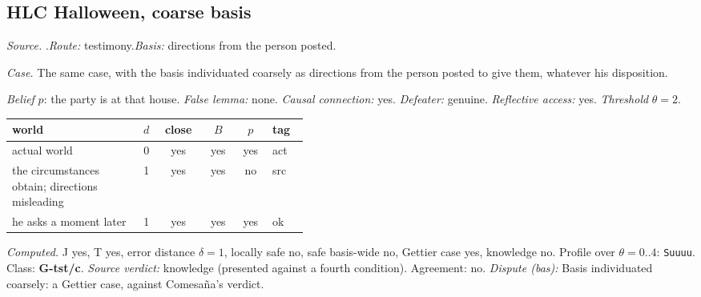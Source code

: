 \subsection*{HLC \enspace Halloween, coarse basis}
\noindent\textit{Source.} \citet{Comesana2005}.\quad \textit{Route:} testimony.\quad \textit{Basis:} directions from the person posted.\par
\noindent\textit{Case.} The same case, with the basis individuated coarsely as directions from the person posted to give them, whatever his disposition.\par
\noindent\textit{Belief} $p$: the party is at that house.
 \textit{False lemma:} none. \textit{Causal connection:} yes. \textit{Defeater:} genuine. \textit{Reflective access:} yes. \textit{Threshold} $\theta = 2$.\par
\begin{center}\begin{tabular}{@{}p{0.43\linewidth}rcccl@{}}
world & $d$ & close & $B$ & $p$ & tag \\ \midrule
actual world & 0 & yes & yes & yes & act \\
the circumstances obtain; directions misleading & 1 & yes & yes & no & src \\
he asks a moment later & 1 & yes & yes & yes & ok \\
\end{tabular}\end{center}
\noindent\textit{Computed.} J yes, T yes, error distance $\delta = 1$, locally safe no, safe basis-wide no, Gettier case yes, knowledge no. Profile over $\theta = 0..4$: \texttt{Suuuu}. Class: \textbf{G-tst/c}.
 \textit{Source verdict:} knowledge (presented against a fourth condition). Agreement: no.
 \textit{Dispute (bas):} Basis individuated coarsely: a Gettier case, against Comesa\~na's verdict.
\par\medskip
{}
